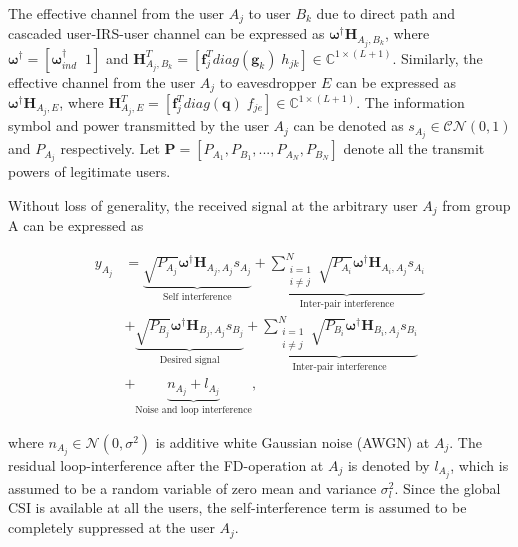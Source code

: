 \documentclass[lettersize,journal]{IEEEtran}
\begin{document}
The effective channel from the user $A_j$ to user $B_k$ due to direct path and cascaded user-IRS-user channel can be expressed as $\boldsymbol{\omega}^\dag \mathbf{H}_{A_j,B_k}$, where $\boldsymbol{\omega}^\dag = [ \boldsymbol{\omega}_{ind}^\dag \;\; 1 ]$ and $\mathbf{H}_{A_j,B_k}^T =  [\boldsymbol{f}_j^{T} diag(\boldsymbol{g}_k) \; h_{jk}] \in \mathbb{C}^{1\times (L+1)}$. Similarly, the effective channel from the user $A_j$ to eavesdropper $E$ can be expressed as $\boldsymbol{\omega}^\dag \mathbf{H}_{A_j,E}$, where $\mathbf{H}_{A_j,E}^T =  [\boldsymbol{f}_j^{T} diag(\boldsymbol{q}) \; f_{je}] \in \mathbb{C}^{1\times (L+1)}$. The information symbol and power transmitted by the user $A_j$ can be denoted as $s_{A_j} \in \mathcal{CN}(0,1)$ and $P_{A_j}$ respectively. Let $\mathbf{P} = [P_{A_1}, P_{B_1}, ..., P_{A_N}, P_{B_N}]$ denote all the transmit powers of legitimate users.

Without loss of generality, the received signal at the arbitrary user $A_j$ from group A can be expressed as

\begin{equation}
\label{eqn1}
\begin{split}
 y_{A_j} & = \underbrace{\sqrt{P_{A_j}} \boldsymbol{\omega}^\dag \mathbf{H}_{A_j,A_j}s_{A_j}}_{\text{Self interference}} + \underbrace{\sum_{\substack{i=1 \\ i\neq j}}^{N} \sqrt{P_{A_i}} \boldsymbol{\omega}^\dag \mathbf{H}_{A_i,A_j}s_{A_i}}_{\text{Inter-pair interference}}  \\& +  \underbrace{\sqrt{P_{B_j}} \boldsymbol{\omega}^\dag \mathbf{H}_{B_j,A_j}s_{B_j}}_{\text{Desired signal}} + \underbrace{\sum_{\substack{i=1 \\ i\neq j}}^{N} \sqrt{P_{B_i}} \boldsymbol{\omega}^\dag \mathbf{H}_{B_i,A_j}s_{B_i}}_{\text{Inter-pair interference}}  \\& + \underbrace{n_{A_j} + l_{A_j}}_{\text{Noise and loop interference}} ,
\end{split}
\end{equation}

\IEEEpubidadjcol

\noindent where $n_{A_j} \in \mathcal{N}(0,\sigma^2)$ is additive white Gaussian noise (AWGN) at $A_j$. The residual loop-interference after the FD-operation at $A_j$ is denoted by $l_{A_j}$, which is assumed to be a random variable of zero mean and variance $\sigma_{l}^2$. Since the global CSI is available at all the users, the self-interference term is assumed to be completely suppressed at the user $A_j$.
\end{document}
